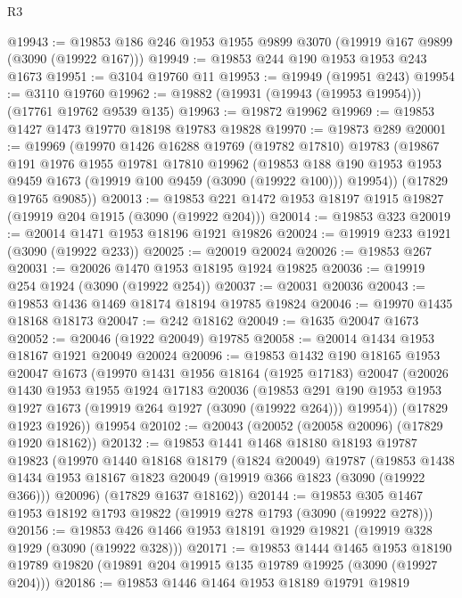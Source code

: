 \begin{lexlean}{R3}
\begin{coremodule}
@19943 := @19853 @186 @246 @1953 @1955 @9899 @3070 (@19919 @167 @9899 (@3090 (@19922 @167)))
@19949 := @19853 @244 @190 @1953 @1953 @243 @1673
@19951 := @3104 @19760 @11
@19953 := @19949 (@19951 @243)
@19954 := @3110 @19760
@19962 := @19882 (@19931 (@19943 (@19953 @19954))) (@17761 @19762 @9539 @135)
@19963 := @19872 @19962
@19969 := @19853 @1427 @1473 @19770 @18198 @19783 @19828
@19970 := @19873 @289
@20001 := @19969
    (@19970
      @1426
      @16288
      @19769
      (@19782 @17810)
      @19783
      (@19867
        @191
        @1976
        @1955
        @19781
        @17810
        @19962
        (@19853 @188 @190 @1953 @1953 @9459 @1673 (@19919 @100 @9459 (@3090 (@19922 @100))) @19954))
      (@17829 @19765 @9085))
@20013 := @19853 @221 @1472 @1953 @18197 @1915 @19827 (@19919 @204 @1915 (@3090 (@19922 @204)))
@20014 := @19853 @323
@20019 := @20014 @1471 @1953 @18196 @1921 @19826
@20024 := @19919 @233 @1921 (@3090 (@19922 @233))
@20025 := @20019 @20024
@20026 := @19853 @267
@20031 := @20026 @1470 @1953 @18195 @1924 @19825
@20036 := @19919 @254 @1924 (@3090 (@19922 @254))
@20037 := @20031 @20036
@20043 := @19853 @1436 @1469 @18174 @18194 @19785 @19824
@20046 := @19970 @1435 @18168 @18173
@20047 := @242 @18162
@20049 := @1635 @20047 @1673
@20052 := @20046 (@1922 @20049) @19785
@20058 := @20014 @1434 @1953 @18167 @1921 @20049 @20024
@20096 := @19853
    @1432
    @190
    @18165
    @1953
    @20047
    @1673
    (@19970
      @1431
      @1956
      @18164
      (@1925 @17183)
      @20047
      (@20026
        @1430
        @1953
        @1955
        @1924
        @17183
        @20036
        (@19853 @291 @190 @1953 @1953 @1927 @1673 (@19919 @264 @1927 (@3090 (@19922 @264))) @19954))
      (@17829 @1923 @1926))
    @19954
@20102 := @20043 (@20052 (@20058 @20096) (@17829 @1920 @18162))
@20132 := @19853
    @1441
    @1468
    @18180
    @18193
    @19787
    @19823
    (@19970
      @1440
      @18168
      @18179
      (@1824 @20049)
      @19787
      (@19853
        @1438
        @1434
        @1953
        @18167
        @1823
        @20049
        (@19919 @366 @1823 (@3090 (@19922 @366)))
        @20096)
      (@17829 @1637 @18162))
@20144 := @19853 @305 @1467 @1953 @18192 @1793 @19822 (@19919 @278 @1793 (@3090 (@19922 @278)))
@20156 := @19853 @426 @1466 @1953 @18191 @1929 @19821 (@19919 @328 @1929 (@3090 (@19922 @328)))
@20171 := @19853
    @1444
    @1465
    @1953
    @18190
    @19789
    @19820
    (@19891 @204 @19915 @135 @19789 @19925 (@3090 (@19927 @204)))
@20186 := @19853
    @1446
    @1464
    @1953
    @18189
    @19791
    @19819

\end{coremodule}
\end{lexlean}
